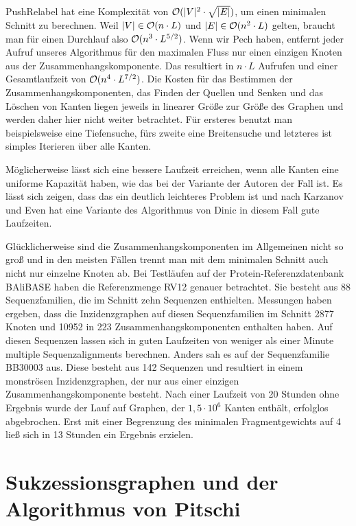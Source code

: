 \textrm{PushRelabel} hat eine Komplexität von $\mathcal{O}(|V|^2\cdot \sqrt{|E|})$, um einen minimalen Schnitt zu berechnen. Weil $|V| \in \mathcal{O}(n\cdot L)$ und $|E| \in \mathcal{O}(n^2\cdot L)$ gelten, braucht man für einen Durchlauf also $\mathcal{O}(n^3\cdot L^{5/2})$. Wenn wir Pech haben, entfernt jeder Aufruf unseres Algorithmus für den maximalen Fluss nur einen einzigen Knoten aus der Zusammenhangskomponente. Das resultiert in $n\cdot L$ Aufrufen und einer Gesamtlaufzeit von $\mathcal{O}(n^4\cdot L^{7/2})$. Die Kosten für das Bestimmen der Zusammenhangskomponenten, das Finden der Quellen und Senken und das Löschen von Kanten liegen jeweils in linearer Größe zur Größe des Graphen und werden daher hier nicht weiter betrachtet. Für ersteres benutzt man beispielsweise eine Tiefensuche, fürs zweite eine Breitensuche und letzteres ist simples Iterieren über alle Kanten.

Möglicherweise lässt sich eine bessere Laufzeit erreichen, wenn alle Kanten eine uniforme Kapazität haben, wie das bei der Variante der Autoren der Fall ist. Es lässt sich zeigen, dass das ein deutlich leichteres Problem ist \cite{gt14} und nach Karzanov und Even hat eine Variante des Algorithmus von Dinic in diesem Fall gute Laufzeiten.

Glücklicherweise sind die Zusammenhangskomponenten im Allgemeinen nicht so groß und in den meisten Fällen trennt man mit dem minimalen Schnitt auch nicht nur einzelne Knoten ab. Bei Testläufen auf der Protein-Referenzdatenbank BAliBASE haben \cite{cpm10} die Referenzmenge RV12 genauer betrachtet. Sie besteht aus 88 Sequenzfamilien, die im Schnitt zehn Sequenzen enthielten. Messungen haben ergeben, dass die Inzidenzgraphen auf diesen Sequenzfamilien im Schnitt 2877 Knoten und 10952 in 223 Zusammenhangskomponenten enthalten haben. Auf diesen Sequenzen lassen sich in guten Laufzeiten von weniger als einer Minute multiple Sequenzalignments berechnen. Anders sah es auf der Sequenzfamilie BB30003 aus. Diese besteht aus 142 Sequenzen und resultiert in einem monströsen Inzidenzgraphen, der nur aus einer einzigen Zusammenhangskomponente besteht. Nach einer Laufzeit von 20 Stunden ohne Ergebnis wurde der Lauf auf Graphen, der $1,5\cdot 10^6$ Kanten enthält, erfolglos abgebrochen. Erst mit einer Begrenzung des minimalen Fragmentgewichts auf 4 ließ sich in 13 Stunden ein Ergebnis erzielen. 

\section{Sukzessionsgraphen und der Algorithmus von Pitschi}

